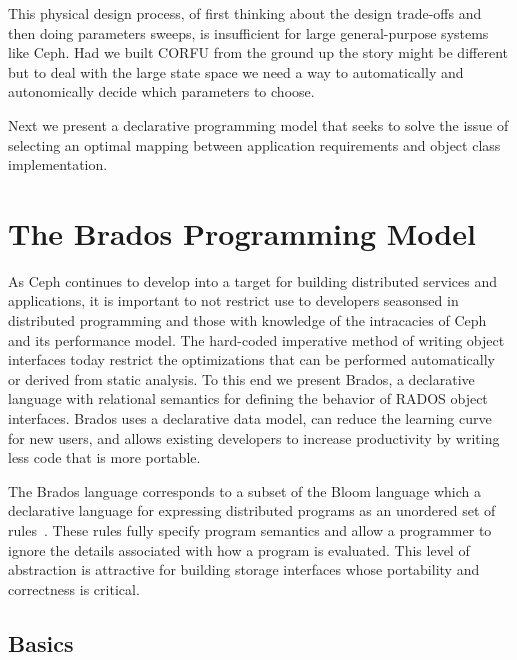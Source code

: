 \documentclass[10pt,twocolumn]{article}
\begin{document}
This physical design process, of first thinking about the design trade-offs and
then doing parameters sweeps, is insufficient for large general-purpose systems
like Ceph. Had we built CORFU from the ground up the story might be
different but to deal with the large state space we need a way to automatically
and autonomically decide which parameters to choose. 

Next we present a declarative programming model that seeks to solve the issue
of selecting an optimal mapping between application requirements and object
class implementation.

\section{The Brados Programming Model}

As Ceph continues to develop into a target for building distributed services
and applications, it is important to not restrict use to developers seasonsed
in distributed programming and those with knowledge of the intracacies of Ceph
and its performance model. The hard-coded imperative method of writing object
interfaces today restrict the optimizations that can be performed
automatically or derived from static analysis.  To this end we present Brados,
a declarative language with relational semantics for defining the behavior of
RADOS object interfaces.  Brados uses a declarative data model, can reduce the
learning curve for new users, and allows existing developers to increase
productivity by writing less code that is more portable.

The Brados language corresponds to a subset of the Bloom language which a
declarative language for expressing distributed programs as an unordered set
of rules~\cite{alvaro:cidr11}. These rules fully specify program semantics and allow a programmer
to ignore the details associated with how a program is evaluated. This level
of abstraction is attractive for building storage interfaces whose portability
and correctness is critical.

\subsection{Basics}
\end{document}
